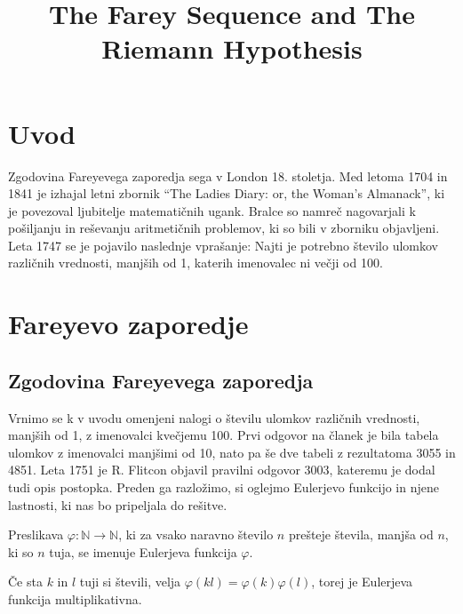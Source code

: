 \documentclass[mat1]{fmfdelo}
\title{The Farey Sequence and The Riemann Hypothesis}
\begin{document}
\section{Uvod}
Zgodovina Fareyevega zaporedja sega v London 18. stoletja. Med letoma 1704 in 1841 je izhajal letni zbornik ``The Ladies Diary: or, the Woman's Almanack'', ki je povezoval ljubitelje matematičnih ugank. Bralce so namreč nagovarjali k pošiljanju in reševanju aritmetičnih problemov, ki so bili v zborniku objavljeni. Leta 1747 se je pojavilo naslednje vprašanje: Najti je potrebno število ulomkov različnih vrednosti, manjših od 1, katerih imenovalec ni večji od 100.


\section{Fareyevo zaporedje}

\subsection{Zgodovina Fareyevega zaporedja}

Vrnimo se k v uvodu omenjeni nalogi o številu ulomkov različnih vrednosti, manjših od 1, z imenovalci kvečjemu 100. Prvi odgovor na članek je bila tabela ulomkov z imenovalci manjšimi od 10, nato pa še dve tabeli z rezultatoma 3055 in 4851. Leta 1751 je R. Flitcon objavil pravilni odgovor 3003, kateremu je dodal tudi opis postopka. Preden ga razložimo, si oglejmo Eulerjevo funkcijo in njene lastnosti, ki nas bo pripeljala do rešitve. 


\begin{definicija}
Preslikava \( \varphi \colon \mathbb{N} \rightarrow  \mathbb{N}\), ki za vsako naravno število $n$ prešteje števila, manjša od $n$, ki so $n$ tuja, se imenuje Eulerjeva funkcija $\varphi$.
\end{definicija}

\begin{trditev}
Če sta $k$ in $l$ tuji si števili, velja $\varphi (kl) = \varphi (k) \varphi (l)$, torej je Eulerjeva funkcija multiplikativna.
\end{trditev}
\end{document}
